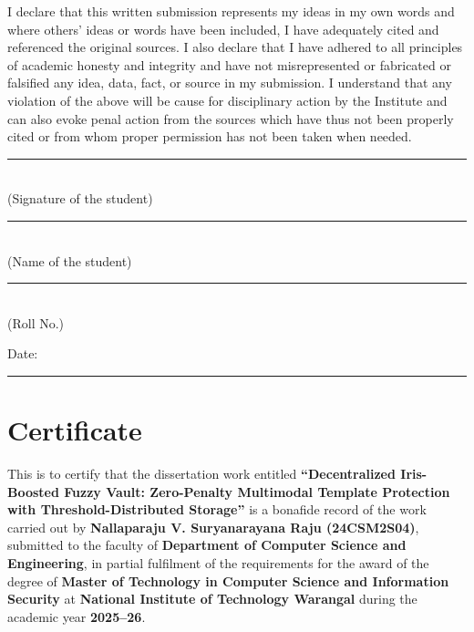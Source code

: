 \documentclass[a4paper,12pt,oneside]{book}
\begin{document}
I declare that this written submission represents my ideas in my own words and where others' ideas or words have been included, I have adequately cited and referenced the original sources. I also declare that I have adhered to all principles of academic honesty and integrity and have not misrepresented or fabricated or falsified any idea, data, fact, or source in my submission. I understand that any violation of the above will be cause for disciplinary action by the Institute and can also evoke penal action from the sources which have thus not been properly cited or from whom proper permission has not been taken when needed.

\vspace{2cm}

\noindent\rule{7cm}{0.4pt}\\
(Signature of the student)

\vspace{1.5cm}

\noindent\rule{7cm}{0.4pt}\\
(Name of the student)

\vspace{1.5cm}

\noindent\rule{7cm}{0.4pt}\\
(Roll No.)

\vspace{2cm}

Date: \rule{5cm}{0.4pt}

\clearpage

\chapter*{Certificate}

This is to certify that the dissertation work entitled {\bfseries ``Decentralized Iris-Boosted Fuzzy Vault: Zero-Penalty Multimodal Template Protection with Threshold-Distributed Storage''} is a bonafide record of the work carried out by {\bfseries Nallaparaju V. Suryanarayana Raju (24CSM2S04)}, submitted to the faculty of {\bfseries Department of Computer Science and Engineering}, in partial fulfilment of the requirements for the award of the degree of {\bfseries Master of Technology in Computer Science and Information Security} at {\bfseries National Institute of Technology Warangal} during the academic year {\bfseries 2025--26}.
\end{document}
